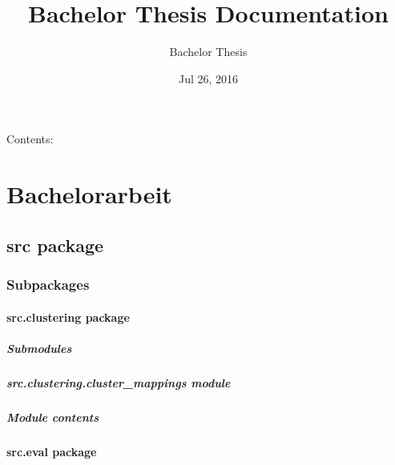 \documentclass[letterpaper,10pt,english]{sphinxmanual}
\title{Bachelor Thesis Documentation}
\date{Jul 26, 2016}
\author{Bachelor Thesis}
\begin{document}
\maketitle
\tableofcontents
{}\label{index::doc}


Contents:


\chapter{Bachelorarbeit}
\label{index:bachelorarbeit}\label{index:welcome-to-bachelor-thesis-s-documentation}

\section{src package}
\label{src::doc}\label{src:src-package}

\subsection{Subpackages}
\label{src:subpackages}

\subsubsection{src.clustering package}
\label{src.clustering:src-clustering-package}\label{src.clustering::doc}

\paragraph{Submodules}
\label{src.clustering:submodules}

\paragraph{src.clustering.cluster\_mappings module}
\label{src.clustering:src-clustering-cluster-mappings-module}

\paragraph{Module contents}
\label{src.clustering:module-contents}\label{src.clustering:module-src.clustering}

\subsubsection{src.eval package}
\label{src.eval::doc}\label{src.eval:src-eval-package}
\end{document}
